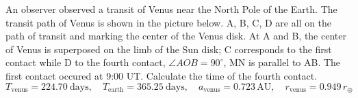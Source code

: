An observer observed a transit of Venus near the North Pole of the Earth. The
transit path of Venus is shown in the picture below. A, B, C, D are all on the
path of transit and marking the center of the Venus disk. At A and B, the
center of Venus is superposed on the limb of the Sun disk; C corresponds to the
first contact while D to the fourth contact, $\angle AOB = 90^\circ$, MN is
parallel to AB. The first contact occured at 9:00 UT. Calculate the time of the
fourth contact.
\[ T_{\mathrm{venus}} = 224.70\ \mathrm{days}, \quad
   T_{\mathrm{earth}} = 365.25\ \mathrm{days}, \quad
   a_{\mathrm{venus}} = 0.723\,\mathrm{AU}, \quad
   r_{\mathrm{venus}} = 0.949\,r_\oplus \]
